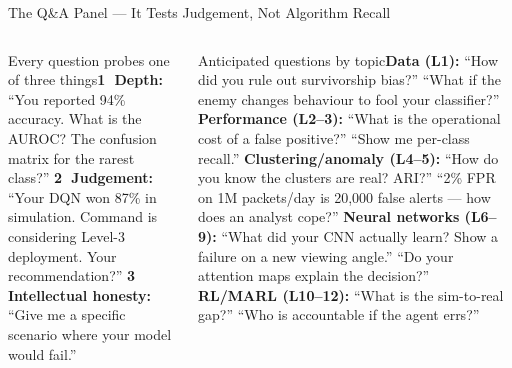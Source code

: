 \documentclass[aspectratio=169,10pt,t]{beamer}
\begin{document}
\begin{frame}{The Q\&A Panel --- It Tests Judgement, Not Algorithm Recall}
\begin{columns}[T]
\begin{cbox}[AccentCol]{Every question probes one of three things}\scriptsize \textbf{\textcircled{\tiny1} Depth:} ``You reported 94\% accuracy. What is the AUROC? The confusion matrix for the rarest class?'' \textbf{\textcircled{\tiny2} Judgement:} ``Your DQN won 87\% in simulation. Command is considering Level-3 deployment. Your recommendation?'' \textbf{\textcircled{\tiny3} Intellectual honesty:} ``Give me a specific scenario where your model would fail.''\end{cbox}
\begin{cbox}[ISSAnavy]{Anticipated questions by topic}\scriptsize \textbf{Data (L1):} ``How did you rule out survivorship bias?'' ``What if the enemy changes behaviour to fool your classifier?'' \textbf{Performance (L2--3):} ``What is the operational cost of a false positive?'' ``Show me per-class recall.'' \textbf{Clustering/anomaly (L4--5):} ``How do you know the clusters are real? ARI?'' ``2\% FPR on 1M packets/day is 20,000 false alerts --- how does an analyst cope?'' \textbf{Neural networks (L6--9):} ``What did your CNN actually learn? Show a failure on a new viewing angle.'' ``Do your attention maps explain the decision?'' \textbf{RL/MARL (L10--12):} ``What is the sim-to-real gap?'' ``Who is accountable if the agent errs?''\end{cbox}
\end{columns}
\end{frame}
\end{document}
